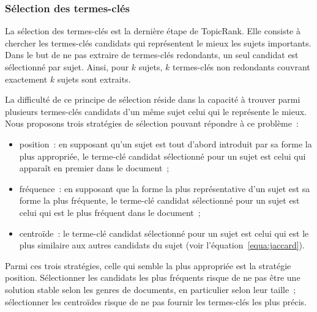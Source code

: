       \subsubsection{Sélection des termes-clés}
      \label{subsubsec:main-automatic_keyphrase_annotation-unsupervised_automatic_keyphrase_extraction-topicrank-keyphrase_selection}
        La sélection des termes-clés est la dernière étape de TopicRank. Elle
        consiste à chercher les termes-clés candidats qui représentent le mieux
        les sujets importants. Dans le but de ne pas extraire de termes-clés
        redondants, un seul candidat est sélectionné par sujet.
        Ainsi, pour $k$ sujets, $k$ termes-clés non redondants couvrant
        exactement $k$ sujets sont extraits.

        La difficulté de ce principe de sélection réside dans la capacité à
        trouver parmi plusieurs termes-clés candidats d'un même sujet celui qui
        le représente le mieux. Nous proposons trois stratégies de sélection
        pouvant répondre à ce problème~:
        \begin{itemize}
          \item{position~: en supposant qu'un sujet est tout d'abord
                introduit par sa forme la plus appropriée, le terme-clé
                candidat sélectionné pour un sujet est celui qui apparaît en
                premier dans le document~;}
          \item{fréquence~: en supposant que la forme la plus représentative
                d'un sujet est sa forme la plus fréquente, le terme-clé candidat
                sélectionné pour un sujet est celui qui est le plus fréquent
                dans le document~;}
          \item{centroïde~: le terme-clé candidat sélectionné pour un sujet
                est celui qui est le plus similaire aux autres candidats du
                sujet (voir l'équation~\ref{equa:jaccard}).}
        \end{itemize}
        Parmi ces trois stratégies, celle qui semble la plus appropriée est la
        stratégie position. Sélectionner les candidats les plus fréquents risque
        de ne pas être une solution stable selon les genres de documents, en
        particulier selon leur taille~; sélectionner les centroïdes risque de ne
        pas fournir les termes-clés les plus précis.

